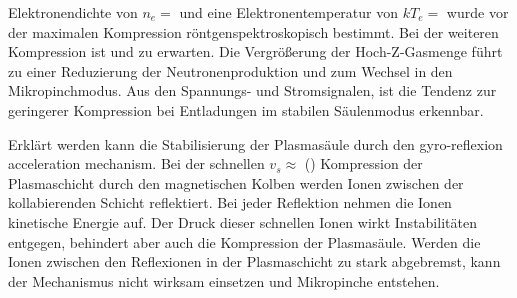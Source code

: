 Elektronendichte von $n_e =$  und eine
Elektronentemperatur von $kT_e =$  wurde
 vor der maximalen Kompression röntgenspektroskopisch
bestimmt. Bei der weiteren Kompression ist  und  zu erwarten. Die
Vergrößerung der Hoch-Z-Gasmenge führt zu einer Reduzierung der
Neutronenproduktion und zum Wechsel in den Mikropinchmodus. Aus
den Spannungs- und Stromsignalen, ist die Tendenz zur geringerer
Kompression bei Entladungen im stabilen Säulenmodus erkennbar.
\par
Erklärt werden kann die Stabilisierung der Plasmasäule durch den
\glqq gyro-reflexion acceleration mechanism\grqq . Bei der
schnellen $v_s \approx$ () Kompression der
Plasmaschicht durch den magnetischen Kolben werden Ionen zwischen
der kollabierenden Schicht reflektiert. Bei jeder Reflektion
nehmen die Ionen kinetische Energie auf. Der Druck dieser
schnellen Ionen wirkt Instabilitäten entgegen, behindert aber auch
die Kompression der Plasmasäule. Werden die Ionen zwischen den
Reflexionen in der Plasmaschicht zu stark abgebremst, kann der
Mechanismus nicht wirksam einsetzen und Mikropinche entstehen.
%
\hfill
